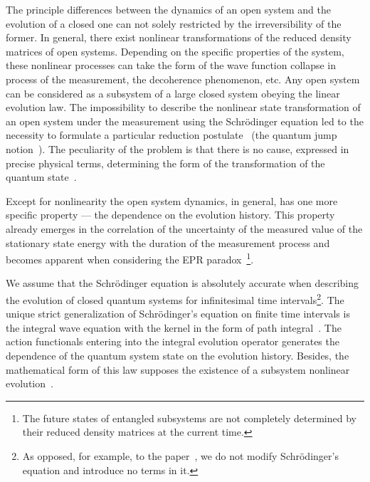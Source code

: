 \renewcommand{\JournalDataOnline}{\displaydate{samarine}}

\makeentitle


The principle differences between the dynamics of an open system and the evolution of a closed one can not solely restricted by the irreversibility of the former. 
In general, there exist nonlinear transformations of the reduced density matrices of open systems.  
Depending on the specific properties of the system, these nonlinear processes can take the form of the wave function collapse in process of the measurement, the decoherence phenomenon, etc. 
Any open system can be considered as a subsystem of a large closed system obeying the linear evolution law. 
The impossibility to describe the nonlinear state transformation of an open system under the measurement using the Schr\"odinger equation led to the necessity to formulate a particular reduction postulate~\cite{bib:1} (the quantum jump notion~\cite{bib:2}). 
The peculiarity of the problem is that there is no cause, expressed in precise physical terms, determining the form of the transformation of the quantum state~\cite{bib:3}.
 
Except for nonlinearity the open system dynamics, in general, has one more specific property --- the dependence on the evolution history. 
This property already emerges in the correlation of the uncertainty of the measured value of the stationary state energy with the duration of the measurement process and becomes apparent when considering the EPR paradox~\cite{bib:4}\footnote{The future states of entangled subsystems are not completely determined by their reduced density matrices at the current time.}\!\!.
 
We assume that the Schr\"odinger equation is absolutely accurate when describing the evolution of closed quantum systems for infinitesimal time intervals\footnote{As opposed, for example, to the paper~\cite{bib:5}, we do not modify Schr\"odinger's equation and introduce no terms in it.}\!\!. 
The unique strict generalization of Schr\"odinger's equation on finite time intervals is the integral wave equation with the kernel in the form of path integral~\cite{bib:6,bib:7}. 
The action functionals entering into the integral evolution operator generates the dependence of the quantum system state on the evolution history. Besides, the mathematical form of this law supposes the existence of a subsystem nonlinear evolution~\cite{bib:8,bib:9}.    



